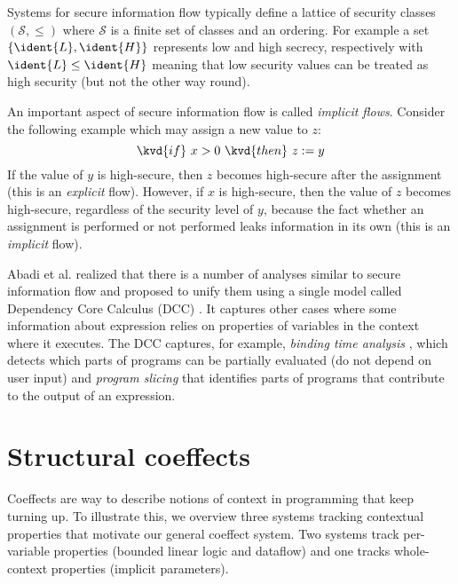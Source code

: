 Systems for secure information flow typically define a lattice of security classes $(\mathcal{S}, \leq)$
where $\mathcal{S}$ is a finite set of classes and an ordering. For example a set $\{\ident{L}, \ident{H}\}$ 
represents low and high secrecy, respectively with $\ident{L} \leq \ident{H}$ meaning that low security
values can be treated as high security (but not the other way round).

An important aspect of secure information flow is called \emph{implicit flows}. Consider the following
example which may assign a new value to $z$:
%
\begin{equation*}
\kvd{if}~x>0~\kvd{then}~z := y
\end{equation*}
%
If the value of $y$ is high-secure, then $z$ becomes high-secure after the assignment
(this is an \emph{explicit} flow). However, if $x$ is high-secure, then the value of
$z$ becomes high-secure, regardless of the security level of $y$, because the fact whether an 
assignment is performed or not performed leaks information in its own (this is an 
\emph{implicit} flow).

Abadi et al. realized that there is a number of analyses similar to secure information flow
and proposed to unify them using a single model called Dependency Core Calculus (DCC) \cite{app-dcc}.
It captures other cases where some information about expression relies on properties of variables
in the context where it executes.  The DCC captures, for example, \emph{binding time analysis}
\cite{app-binding-time-analysis}, which detects which parts of programs can be partially evaluated
(do not depend on user input) and \emph{program slicing} \cite{app-slicing-survey} that identifies
parts of programs that contribute to the output of an expression.
	

\section{Structural coeffects}
\label{sec:intro-coeffects}

Coeffects are way to describe notions of context in programming that keep turning up. 
To illustrate this, we overview three systems tracking contextual properties that 
 motivate our general coeffect system. Two systems track per-variable properties (bounded 
linear logic and dataflow) and one tracks whole-context properties (implicit parameters).

